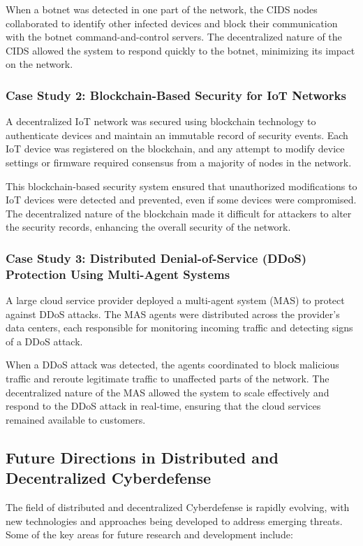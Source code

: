 When a botnet was detected in one part of the network, the CIDS nodes collaborated to identify other infected devices and block their communication with the botnet command-and-control servers. The decentralized nature of the CIDS allowed the system to respond quickly to the botnet, minimizing its impact on the network.

\subsubsection{Case Study 2: Blockchain-Based Security for IoT Networks}

A decentralized IoT network was secured using blockchain technology to authenticate devices and maintain an immutable record of security events. Each IoT device was registered on the blockchain, and any attempt to modify device settings or firmware required consensus from a majority of nodes in the network.

This blockchain-based security system ensured that unauthorized modifications to IoT devices were detected and prevented, even if some devices were compromised. The decentralized nature of the blockchain made it difficult for attackers to alter the security records, enhancing the overall security of the network.

\subsubsection{Case Study 3: Distributed Denial-of-Service (DDoS) Protection Using Multi-Agent Systems}

A large cloud service provider deployed a multi-agent system (MAS) to protect against DDoS attacks. The MAS agents were distributed across the provider's data centers, each responsible for monitoring incoming traffic and detecting signs of a DDoS attack.

When a DDoS attack was detected, the agents coordinated to block malicious traffic and reroute legitimate traffic to unaffected parts of the network. The decentralized nature of the MAS allowed the system to scale effectively and respond to the DDoS attack in real-time, ensuring that the cloud services remained available to customers.

\subsection{Future Directions in Distributed and Decentralized Cyberdefense}

The field of distributed and decentralized Cyberdefense is rapidly evolving, with new technologies and approaches being developed to address emerging threats. Some of the key areas for future research and development include:

